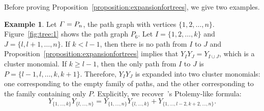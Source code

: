 \documentclass[11pt]{article}
\theoremstyle{definition}
\newtheorem{exam}[theo]{Example}
\numberwithin{equation}{section}
\begin{document}
Before proving Proposition~\ref{proposition:expansionfortrees},
we give two examples.

\begin{exam}
    Let \(\varGamma = P_n\), the path graph with vertices \(\{1, 2, \dots, n\}\).
    Figure~\ref{fig:tree:1} shows the path graph \(P_6\).
    Let \(I = \{1, 2, \dots, k\}\) and \(J = \{l, l+1, \dots, n\}\).
    If \(k < l - 1\), then there is no path from \(I\) to \(J\) and Proposition~\ref{proposition:expansionfortrees} implies that \(Y_{I} Y_{J} = Y_{I \cup J}\), which is a cluster monomial.
    If \(k \geq l - 1\), then the only path from \(I\) to \(J\) is \(P=\{l-1, l, \dots, k, k+1\}\).
    Therefore, \(Y_{I} Y_{J}\) is expanded into two cluster monomials:
    one corresponding to the empty family of paths,
    and the other corresponding to the family containing only \(P\).
    Explicitly, we recover~\cite[Theorem~6.1]{linearLP}'s Ptolemy-like formula:
    \begin{equation*}
        Y_{\{1, \dots, k\}} Y_{\{l, \dots, n\}}
        = Y_{\{1, \dots, n\}} Y_{\{l, \dots, k\}}
          + Y_{\{1, \dots, l-2, k+2, \dots, n\}}.
    \end{equation*}
\end{exam}
\end{document}
